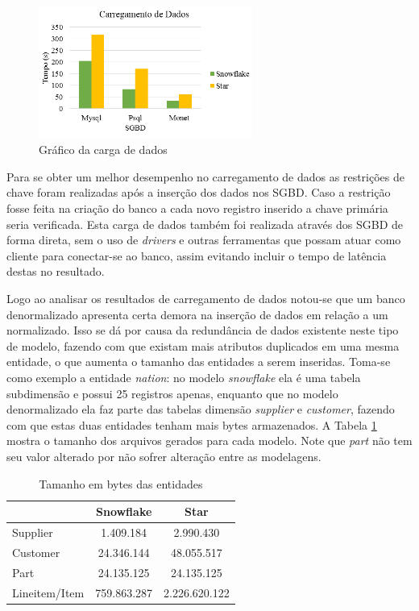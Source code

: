 \documentclass[conference]{IEEEtran}
\begin{document}
\begin{figure}[htpb]
  \centering
  \includegraphics[width=7cm]{carregamento}
  \caption{Gráfico da carga de dados}
  \label{fig:carga}
\end{figure}

Para se obter um melhor desempenho no carregamento de dados as restrições de chave foram realizadas após a inserção dos dados nos SGBD. Caso a restrição fosse feita na criação do banco a cada novo registro inserido a chave primária seria verificada. Esta carga de dados também foi realizada através dos SGBD de forma direta, sem o uso de \textit{drivers} e outras ferramentas que possam atuar como cliente para conectar-se ao banco, assim evitando incluir o tempo de latência destas no resultado.

Logo ao analisar os resultados de carregamento de dados notou-se que um banco denormalizado apresenta certa demora na inserção de dados em relação a um normalizado. Isso se dá por causa da redundância de dados existente neste tipo de modelo, fazendo com que existam mais atributos duplicados em uma mesma entidade, o que aumenta o tamanho das entidades a serem inseridas. Toma-se como exemplo a entidade \textit{nation}: no modelo \textit{snowflake} ela é uma tabela subdimensão e possui 25 registros apenas, enquanto que no modelo denormalizado ela faz parte das tabelas dimensão \textit{supplier} e \textit{customer}, fazendo com que estas duas entidades tenham mais bytes armazenados. A Tabela \ref{tab:tamanho} mostra o tamanho dos arquivos gerados para cada modelo. Note que \textit{part} não tem seu valor alterado por não sofrer alteração entre as modelagens.

\begin{table}[htpb]
\centering
\caption{Tamanho em bytes das entidades}
\label{tab:tamanho}
\begin{tabular}{@{}lcc@{}}
\toprule
              & Snowflake & Star       \\ \midrule
Supplier      & 1.409.184   & 2.990.430    \\
Customer      & 24.346.144  & 48.055.517   \\
Part          & 24.135.125  & 24.135.125   \\
Lineitem/Item & 759.863.287 & 2.226.620.122 \\ \bottomrule
\end{tabular}
\end{table}
\end{document}
